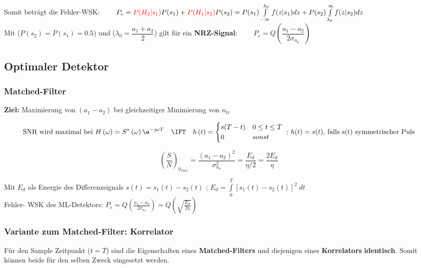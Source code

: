 Somit beträgt die Fehler-WSK: $ \qquad P_e = \textcolor{red}{P(H_2 | s_1)} P(s_1) + \textcolor{red}{P(H_1 | s_2)}P(s_2) = 
 P(s_1) \int\limits_{-\infty}^{\lambda_0} f(z|s_1) dz + P(s_2) \int\limits_{\lambda_0}^{\infty}
 f(z|s_2) dz$ \\
Mit ($P(s_2) = P(s_1) = 0.5$) und ($\lambda_0 = \dfrac{a_1 + a_2}{2}$) gilt für ein
\textbf{NRZ-Signal}: $ \qquad P_e = Q \left(\dfrac{a_1 - a_2}{2 \sigma_{n_0}}\right) $



\subsection{Optimaler Detektor }
\subsubsection{Matched-Filter}
\label{09_matched_filter}
	\textbf{Ziel: } Maximierung von $(a_1 - a_2)$ bei gleichzeitiger Minimierung
	von $n_0$.
 
	$$\text{SNR wird maximal bei } H \left( \omega \right) = S^* \left( \omega
	\right) \e^{-\jmath \omega T} \quad \IFT \quad h \left( t \right) = 
	\begin{cases} s(T-t) & 0 \leq t \leq T \\
	0 & sonst\end{cases}\text{ ; }h(t) = s(t) \text{, falls s(t) symmetrischer Puls}$$
	\begin{minipage}{6cm}{	
		$$ \left(\dfrac{S}{N}\right)_{0_{max}} = \dfrac{(a_1 - a_2)^2}{\sigma_{n_o}^2} = \dfrac{E_d}{\eta / 2} = \dfrac{2E_d}{\eta}$$} 	
	\end{minipage}
	\begin{minipage}{14cm}
		Mit $E_d$ als Energie des Differenzsignals $s(t) = s_1(t) - s_2(t)$ ; $ E_d = \int\limits_{0}^{T}[s_1(t) - s_2(t)]^2 \; dt$ \\
		
		Fehler- WSK des ML-Detektors: $P_e = Q\left(\frac{a_1 - a_2}{2\sigma_{n_o}}\right)  = Q\left(\sqrt{\frac{E_d}{2 \eta}} \right)$
	\end{minipage}
 	

\subsubsection{Variante zum Matched-Filter: Korrelator} \label{09_korrelator}
Für den Sample Zeitpunkt ($t=T$) sind die Eigenschaften eines \textbf{Matched-Filters} und diejenigen eines
\textbf{Korrelators} \textbf{identisch}. Somit können beide für den selben Zweck eingesetzt werden.

